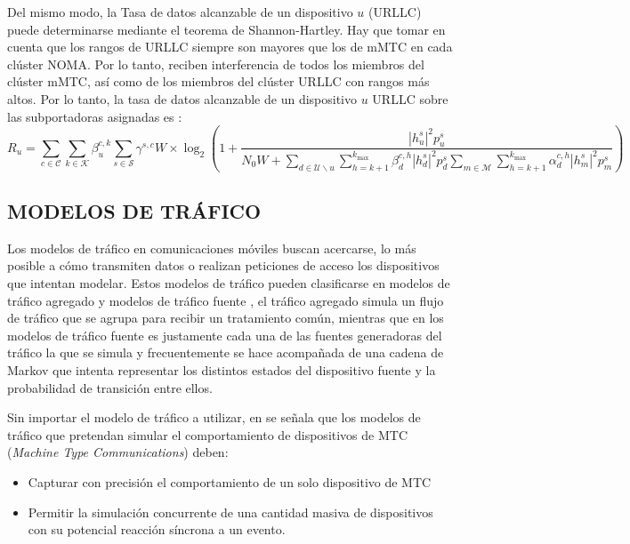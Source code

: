 Del mismo modo, la Tasa de datos alcanzable de un dispositivo $u$ (URLLC) puede determinarse mediante el teorema de Shannon-Hartley. Hay que tomar en cuenta que los rangos de URLLC siempre son mayores que los de mMTC en cada clúster NOMA. Por lo tanto, reciben interferencia de todos los miembros del clúster mMTC, así como de los miembros del clúster URLLC con rangos más altos. 
Por lo tanto, la tasa de datos alcanzable de un dispositivo $u$ URLLC sobre las subportadoras asignadas es \parencite{Shahini2019}:
\begin{equation}
{R_{u}}=\sum \limits _{c \in \mathcal {C}} {\sum \limits _{k \in \mathcal {K}} {\beta _{u}^{c,k}\sum \limits _{s \in \mathcal {S}} {{\gamma ^{s,c}}W} } } \times {\log _{2}}\left ({{1 + \frac {{{{\left |{ {h_{u}^{s}} }\right |}^{2}}p_{u}^{s}}}{{N_{0}W + \sum \limits _{d \in \mathcal {U}\backslash u} {\sum \limits _{h = k + 1}^{{k_{\max }}} {\beta _{d}^{c,h}{{\left |{ {h_{d}^{s}} }\right |}^{2}}p_{d}^{s}}} \sum \limits _{m \in \mathcal {M}} {\sum \limits _{h = k + 1}^{{k_{\max }}} {\alpha _{d}^{c,h}{{\left |{ {h_{m}^{s}} }\right |}^{2}}p_{m}^{s}} } }}} }\right)
\label{eqn:Ru}
\end{equation}

\subsection{MODELOS DE TRÁFICO}

Los modelos de tráfico en comunicaciones móviles buscan acercarse, lo más posible a cómo transmiten datos o realizan peticiones de acceso los dispositivos que intentan modelar. Estos modelos de tráfico pueden clasificarse en modelos de tráfico\textbf{ }agregado y modelos de tráfico fuente \parencite{Laner2013}, el tráfico agregado simula un flujo de tráfico que se agrupa para recibir un tratamiento común, mientras que en los modelos de tráfico fuente es justamente cada una de las fuentes generadoras del tráfico la que se simula y frecuentemente se hace acompañada de una cadena de Markov que intenta representar los distintos estados del dispositivo fuente y la probabilidad de transición entre ellos.\newline

Sin importar el modelo de tráfico a utilizar, en \parencite{Laner2013} se señala que los modelos de tráfico que pretendan simular el comportamiento de dispositivos de MTC (\textit{Machine Type Communications}) deben:

\begin{itemize}
\item  Capturar con precisión el comportamiento de un solo dispositivo de MTC 
\item  Permitir la simulación concurrente de una cantidad masiva de dispositivos con su potencial reacción síncrona a un evento.
\end{itemize}

